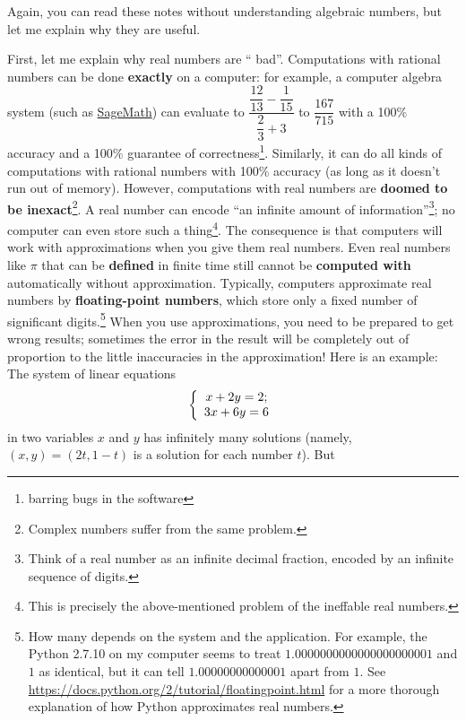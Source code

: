 \documentclass[numbers=enddot,12pt,final,onecolumn,notitlepage]{scrartcl}%
\theoremstyle{definition}
\begin{document}
\begin{itemize}
Again, you can read these notes without understanding algebraic numbers, but
let me explain why they are useful.

First, let me explain why real numbers are \textquotedblleft
bad\textquotedblright. Computations with rational numbers can be done
\textbf{exactly} on a computer: for example, a computer algebra system (such
as \href{http://www.sagemath.org/}{SageMath}) can evaluate to $\dfrac
{\dfrac{12}{13}-\dfrac{1}{15}}{\dfrac{2}{3}+3}$ to $\dfrac{167}{715}$ with a
100\% accuracy and a 100\% guarantee of correctness\footnote{barring bugs in
the software}. Similarly, it can do all kinds of computations with rational
numbers with 100\% accuracy (as long as it doesn't run out of memory).
However, computations with real numbers are \textbf{doomed to be
inexact}\footnote{Complex numbers suffer from the same problem.}. A real
number can encode \textquotedblleft an infinite amount of
information\textquotedblright\footnote{Think of a real number as an infinite
decimal fraction, encoded by an infinite sequence of digits.}; no computer can
even store such a thing\footnote{This is precisely the above-mentioned problem
of the ineffable real numbers.}. The consequence is that computers will work
with approximations when you give them real numbers. Even real numbers like
$\pi$ that can be \textbf{defined} in finite time still cannot be
\textbf{computed with} automatically without approximation. Typically,
computers approximate real numbers by \textbf{floating-point numbers}, which
store only a fixed number of significant digits.\footnote{How many depends on
the system and the application. For example, the Python 2.7.10 on my computer
seems to treat $1.0000000000000000000001$ and $1$ as identical, but it can
tell $1.00000000000001$ apart from $1$. See
\url{https://docs.python.org/2/tutorial/floatingpoint.html} for a more
thorough explanation of how Python approximates real numbers.} When you use
approximations, you need to be prepared to get wrong results; sometimes the
error in the result will be completely out of proportion to the little
inaccuracies in the approximation! Here is an example: The system of linear
equations%
\begin{equation}
\left\{
\begin{array}
[c]{c}%
x+2y=2;\\
3x+6y=6
\end{array}
\right.  \label{eq.inexact.1}%
\end{equation}
in two variables $x$ and $y$ has infinitely many solutions (namely, $\left(
x,y\right)  =\left(  2t,1-t\right)  $ is a solution for each number $t$). But

\end{itemize}
\end{document}
